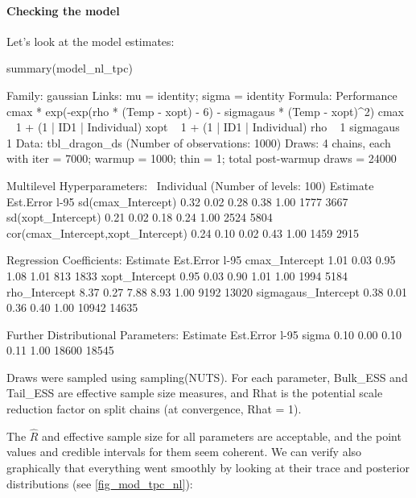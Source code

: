 \documentclass[a4paper,12pt,twoside]{article}
\begin{document}
\paragraph{Checking the model}
Let's look at the model estimates:
\begin{Rinput}
summary(model_nl_tpc)
\end{Rinput}
\begin{Routput}
 Family: gaussian 
  Links: mu = identity; sigma = identity 
Formula: Performance ~ cmax * exp(-exp(rho * (Temp - xopt) - 6) - sigmagaus * (Temp - xopt)^2) 
         cmax ~ 1 + (1 | ID1 | Individual)
         xopt ~ 1 + (1 | ID1 | Individual)
         rho ~ 1
         sigmagaus ~ 1
   Data: tbl_dragon_ds (Number of observations: 1000) 
  Draws: 4 chains, each with iter = 7000; warmup = 1000; thin = 1;
         total post-warmup draws = 24000

Multilevel Hyperparameters:
~Individual (Number of levels: 100) 
                                   Estimate Est.Error l-95%
sd(cmax_Intercept)                     0.32      0.02     0.28     0.38 1.00     1777     3667
sd(xopt_Intercept)                     0.21      0.02     0.18     0.24 1.00     2524     5804
cor(cmax_Intercept,xopt_Intercept)     0.24      0.10     0.02     0.43 1.00     1459     2915

Regression Coefficients:
                    Estimate Est.Error l-95%
cmax_Intercept          1.01      0.03     0.95     1.08 1.01      813     1833
xopt_Intercept          0.95      0.03     0.90     1.01 1.00     1994     5184
rho_Intercept           8.37      0.27     7.88     8.93 1.00     9192    13020
sigmagaus_Intercept     0.38      0.01     0.36     0.40 1.00    10942    14635

Further Distributional Parameters:
      Estimate Est.Error l-95%
sigma     0.10      0.00     0.10     0.11 1.00    18600    18545

Draws were sampled using sampling(NUTS). For each parameter, Bulk_ESS
and Tail_ESS are effective sample size measures, and Rhat is the potential
scale reduction factor on split chains (at convergence, Rhat = 1).
\end{Routput}
The $\hat{R}$ and effective sample size for all parameters are acceptable, and the point values and credible intervals for them seem coherent. We can verify also graphically that everything went smoothly by looking at their trace and posterior distributions (see \autoref{fig_mod_tpc_nl}):
\end{document}
